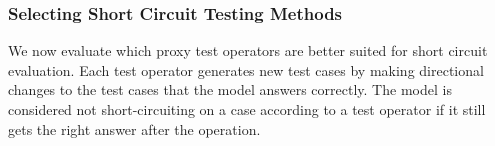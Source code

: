 \subsubsection{Selecting Short Circuit Testing Methods}
\label{sec:select-sc}
We now evaluate which proxy test operators are better suited for short circuit evaluation.
Each test operator generates new test cases by making directional changes to
the test cases that the model answers correctly. 
The model is considered not short-circuiting on a case according 
to a test operator if it still gets the right answer after the operation. 

